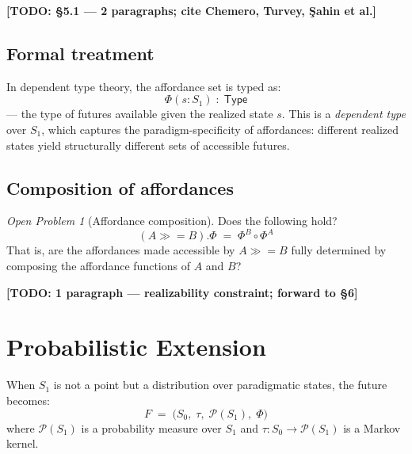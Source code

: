 \documentclass[11pt, a4paper]{article}
\theoremstyle{plain}
\theoremstyle{definition}
\theoremstyle{remark}
\newtheorem{openproblem}{Open Problem}
\newcommand{\bind}{\mathbin{\gg\!=}}          %
\newcommand{\Szero}{S_0}                       %
\newcommand{\Sone}{S_1}                        %
\newcommand{\traj}{\tau}                       %
\newcommand{\aff}{\Phi}                        %
\begin{document}

\textbf{[TODO: \S5.1 — 2 paragraphs; cite Chemero, Turvey, Şahin et al.]}

\subsection{Formal treatment}

In dependent type theory, the affordance set is typed as:
\[
  \aff(s \colon \Sone) \;\colon\; \mathsf{Type}
\]
— the type of futures available given the realized state $s$.
This is a \emph{dependent type} over $\Sone$, which captures the
paradigm-specificity of affordances: different realized states yield
structurally different sets of accessible futures.

\subsection{Composition of affordances}

\begin{openproblem}[Affordance composition]
\label{op:aff-comp}
Does the following hold?
\[
  (A \bind B).\aff \;=\; \aff^B \circ \aff^A
\]
That is, are the affordances made accessible by $A \bind B$ fully
determined by composing the affordance functions of $A$ and $B$?
\end{openproblem}


\textbf{[TODO: 1 paragraph — realizability constraint; forward to \S6]}

\section{Probabilistic Extension}
\label{sec:probabilistic}

When $\Sone$ is not a point but a distribution over paradigmatic states,
the future becomes:
\[
  F \;=\; \bigl(\Szero,\; \traj,\; \mathcal{P}(\Sone),\; \aff\bigr)
\]
where $\mathcal{P}(\Sone)$ is a probability measure over $\Sone$ and
$\traj\colon \Szero \to \mathcal{P}(\Sone)$ is a Markov kernel.
\end{document}
